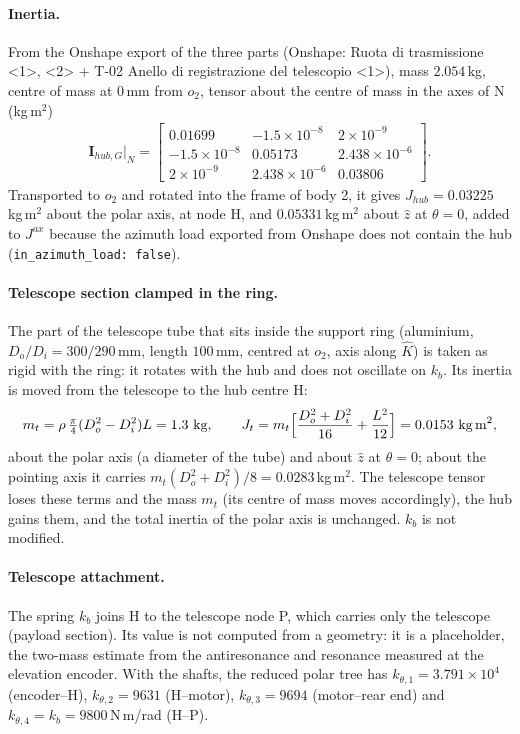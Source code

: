 \documentclass[10pt,a4paper]{article}
\numberwithin{equation}{section}
\begin{document}
\paragraph{Inertia.} From the Onshape export of the three parts (Onshape: Ruota di trasmissione <1>, <2> + T-02 Anello di registrazione del telescopio <1>), mass $2.054$\,kg, centre of mass at $0$\,mm from $o_2$, tensor about the centre of mass in the axes of N (kg\,m$^2$)
\begin{gather}
\mathbf I_{hub,G}|_N = \begin{bmatrix}0.01699 & -1.5\times10^{-8} & 2\times10^{-9} \\ -1.5\times10^{-8} & 0.05173 & 2.438\times10^{-6} \\ 2\times10^{-9} & 2.438\times10^{-6} & 0.03806\end{bmatrix}.
\end{gather}
Transported to $o_2$ and rotated into the frame of body 2, it gives $J_{hub} = 0.03225$\,kg\,m$^2$ about the polar axis, at node H, and $0.05331$\,kg\,m$^2$ about $\hat z$ at $\theta = 0$, added to $J^{ax}$ because the azimuth load exported from Onshape does not contain the hub (\texttt{in\_azimuth\_load: false}).
\paragraph{Telescope section clamped in the ring.} The part of the telescope tube that sits inside the support ring (aluminium, $D_o/D_i = 300/290$\,mm, length $100$\,mm, centred at $o_2$, axis along $\hat K$) is taken as rigid with the ring: it rotates with the hub and does not oscillate on $k_b$. Its inertia is moved from the telescope to the hub centre H:\begin{gather}m_t = \rho\,\tfrac{\pi}{4}(D_o^2 - D_i^2)L = 1.3\ \text{kg},\qquad J_t = m_t\Bigl[\frac{D_o^2 + D_i^2}{16} + \frac{L^2}{12}\Bigr] = 0.0153\ \text{kg\,m}^2,\end{gather}about the polar axis (a diameter of the tube) and about $\hat z$ at $\theta = 0$; about the pointing axis it carries $m_t(D_o^2 + D_i^2)/8 = 0.0283$\,kg\,m$^2$. The telescope tensor loses these terms and the mass $m_t$ (its centre of mass moves accordingly), the hub gains them, and the total inertia of the polar axis is unchanged. $k_b$ is not modified.
\paragraph{Telescope attachment.} The spring $k_b$ joins H to the telescope node P, which carries only the telescope (payload section). Its value is not computed from a geometry: it is a placeholder, the two-mass estimate from the antiresonance and resonance measured at the elevation encoder. With the shafts, the reduced polar tree has $k_{\theta,1} = 3.791\times10^{4}$ (encoder--H), $k_{\theta,2} = 9631$ (H--motor), $k_{\theta,3} = 9694$ (motor--rear end) and $k_{\theta,4} = k_b = 9800$\,N\,m/rad (H--P).
\end{document}

